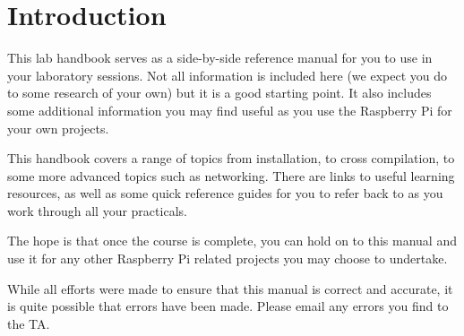 \setcounter{section}{0}
\section*{Introduction}
This lab handbook serves as a side-by-side reference manual for you to use in your laboratory sessions. Not all information is included here (we expect you do to some research of your own) but it is a good starting point. It also includes some additional information you may find useful as you use the Raspberry Pi for your own projects.

This handbook covers a range of topics from installation, to cross compilation, to some more advanced topics such as networking. There are links to useful learning resources, as well as some quick reference guides for you to refer back to as you work through all your practicals.

The hope is that once the course is complete, you can hold on to this manual and use it for any other Raspberry Pi related projects you may choose to undertake. 

While all efforts were made to ensure that this manual is correct and accurate, it is quite possible that errors have been made. Please email any errors you find to the TA.